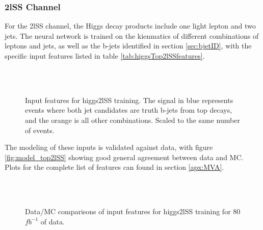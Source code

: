\subsubsection{2lSS Channel}
\label{subsec:higgs2lSS}

For the 2lSS channel, the Higgs decay products include one light lepton and two jets. The neural network is trained on the kienmatics of different combinations of leptons and jets, as well as the b-jets identified in section \ref{sec:bjetID}, with the specific input features listed in table \ref{tab:higgsTop2lSSfeatures}.



\begin{figure}[h!]
    \\
    \\
    \caption{Input features for higgs2lSS training. The signal in blue represents events where both jet candidates are truth b-jets from top decays, and the orange is all other combinations. Scaled to the same number of events.}
    \label{fig:features_higgs2lSS}
\end{figure}

The modeling of these inputs is validated against data, with figure \ref{fig:model_top2lSS} showing good general agreement between data and MC. Plots for the complete list of features can found in section \ref{apx:MVA}.

\begin{figure}[h!]
    \\
    \\
    \caption{Data/MC comparisons of input features for higgs2lSS training for 80 $fb^{-1}$ of data.}
    \label{fig:model_higgs2lSS}
\end{figure}

